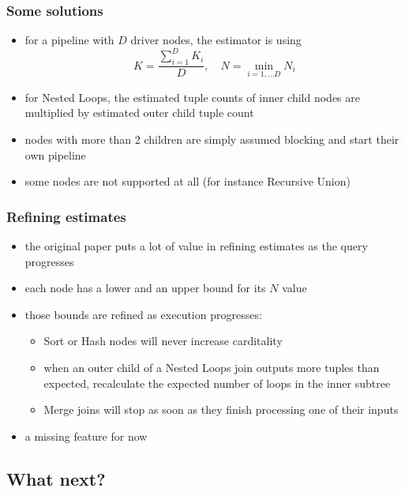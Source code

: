 \documentclass{beamer}
\begin{document}
\begin{frame}
  \frametitle{Some solutions}

  \begin{itemize}
  \item for a pipeline with $D$ driver nodes, the estimator is using
    \begin{equation*}
      K = \frac{\sum\limits_{i=1}^{D} K_{i}}{D}, \quad N = \min\limits_{i=1,\dots D} N_{i}
    \end{equation*}
  \item for Nested Loops, the estimated tuple counts of inner child nodes are
    multiplied by estimated outer child tuple count
  \item nodes with more than 2 children are simply assumed blocking and start
    their own pipeline
  \item some nodes are not supported at all (for instance Recursive Union)
  \end{itemize}
\end{frame}

\begin{frame}
  \frametitle{Refining estimates}

  \begin{itemize}
  \item the original paper puts a lot of value in refining estimates as the
    query progresses
  \item each node has a lower and an upper bound for its $N$ value
  \item those bounds are refined as execution progresses:
    \begin{itemize}
    \item Sort or Hash nodes will never increase carditality
    \item when an outer child of a Nested Loops join outputs more tuples than
      expected, recalculate the expected number of loops in the inner subtree
    \item Merge joins will stop as soon as they finish processing one of their
      inputs
    \end{itemize}
  \item a missing feature for now
  \end{itemize}
\end{frame}

\subsection{What next?}
\end{document}
